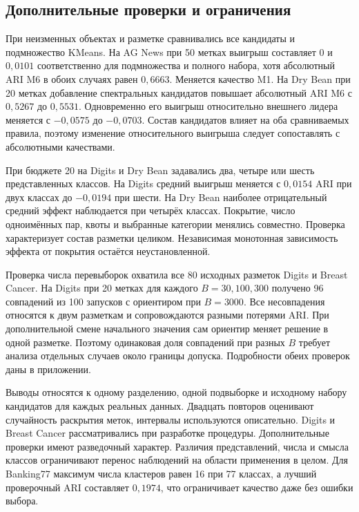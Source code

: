 \subsection{Дополнительные проверки и ограничения}
При неизменных объектах и разметке сравнивались все кандидаты и подмножество KMeans. На AG News при 50 метках выигрыш составляет $0$ и $0{,}0101$ соответственно для подмножества и полного набора, хотя абсолютный ARI M6 в обоих случаях равен $0{,}6663$. Меняется качество M1. На Dry Bean при 20 метках добавление спектральных кандидатов повышает абсолютный ARI M6 с $0{,}5267$ до $0{,}5531$. Одновременно его выигрыш относительно внешнего лидера меняется с $-0{,}0575$ до $-0{,}0703$. Состав кандидатов влияет на оба сравниваемых правила, поэтому изменение относительного выигрыша следует сопоставлять с абсолютными качествами.

При бюджете 20 на Digits и Dry Bean задавались два, четыре или шесть представленных классов. На Digits средний выигрыш меняется с $0{,}0154$ ARI при двух классах до $-0{,}0194$ при шести. На Dry Bean наиболее отрицательный средний эффект наблюдается при четырёх классах. Покрытие, число одноимённых пар, квоты и выбранные категории менялись совместно. Проверка характеризует состав разметки целиком. Независимая монотонная зависимость эффекта от покрытия остаётся неустановленной.

Проверка числа перевыборок охватила все 80 исходных разметок Digits и Breast Cancer. На Digits при 20 метках для каждого $B=30,100,300$ получено 96 совпадений из 100 запусков с ориентиром при $B=3000$. Все несовпадения относятся к двум разметкам и сопровождаются разными потерями ARI. При дополнительной смене начального значения сам ориентир меняет решение в одной разметке. Поэтому одинаковая доля совпадений при разных $B$ требует анализа отдельных случаев около границы допуска. Подробности обеих проверок даны в приложении.

Выводы относятся к одному разделению, одной подвыборке и исходному набору кандидатов для каждых реальных данных. Двадцать повторов оценивают случайность раскрытия меток, интервалы используются описательно. Digits и Breast Cancer рассматривались при разработке процедуры. Дополнительные проверки имеют разведочный характер. Различия представлений, числа и смысла классов ограничивают перенос наблюдений на области применения в целом. Для Banking77 максимум числа кластеров равен 16 при 77 классах, а лучший проверочный ARI составляет $0{,}1974$, что ограничивает качество даже без ошибки выбора.
